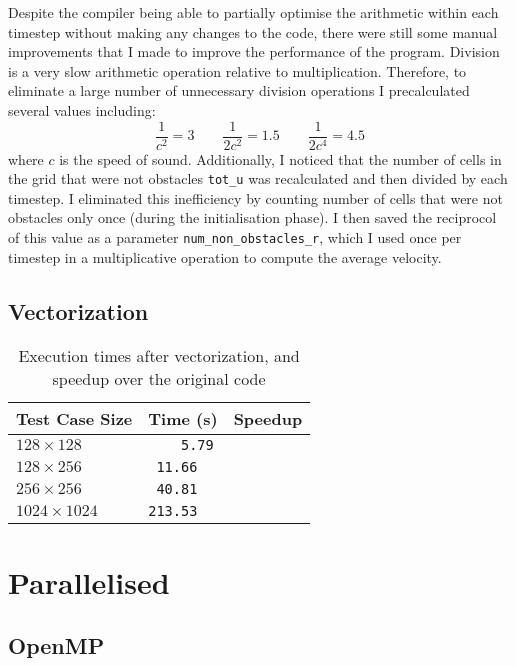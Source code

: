 \documentclass[11pt, twocolumn, a4paper]{article}
\begin{document}
Despite the compiler being able to partially optimise the arithmetic within each timestep without making any changes to the code, there were still some manual improvements that I made to improve the performance of the program.
Division is a very slow arithmetic operation relative to multiplication.
Therefore, to eliminate a large number of unnecessary division operations I precalculated several values including:
\[
    \frac{1}{c^2} = 3\qquad
    \frac{1}{2c^2} = 1.5\qquad
    \frac{1}{2c^4} = 4.5
\]
where $c$ is the speed of sound.
Additionally, I noticed that the number of cells in the grid that were not obstacles \texttt{tot\_u} was recalculated and then divided by each timestep.
I eliminated this inefficiency by counting number of cells that were not obstacles only once (during the initialisation phase).
I then saved the reciprocol of this value as a parameter \texttt{num\_non\_obstacles\_r}, which I used once per timestep in a multiplicative operation to compute the average velocity.

\subsection{Vectorization}

\begin{table}[htbp]
    \begin{center}
    \caption{Execution times after vectorization, and speedup over the original code}\label{tab:vectorized}
    \begin{tabular}{l | l l} 
        \hline\hline
        Test Case Size&Time (s)&Speedup\\
        \hline
        $128 \times 128$&\texttt{  \,\,\,5.79}&\texttt{}\\
        $128 \times 256$&\texttt{ 11.66}&\texttt{}\\
        $256 \times 256$&\texttt{ 40.81}&\texttt{}\\
        $1024 \times 1024$&\texttt{213.53}&\texttt{}\\
        \hline
      \end{tabular}
    \end{center}
\end{table} 

\section{Parallelised}

\subsection{OpenMP}
\end{document}
